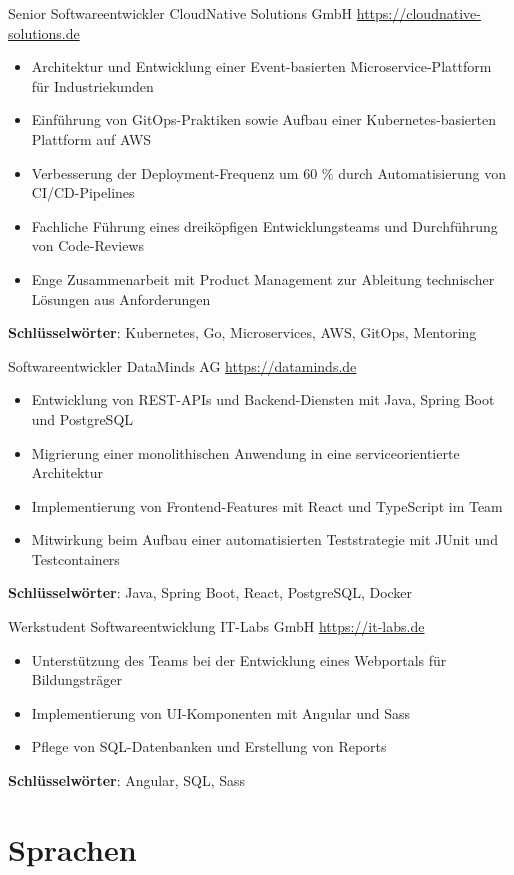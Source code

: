 \documentclass[a4paper, serif, 10pt]{moderncv}
\begin{document}
        {Senior Softwareentwickler}
        {CloudNative Solutions GmbH}
        {\url{https://cloudnative-solutions.de}}
        {}
        {\begin{itemize}
\item Architektur und Entwicklung einer Event-basierten Microservice-Plattform für Industriekunden
\item Einführung von GitOps-Praktiken sowie Aufbau einer Kubernetes-basierten Plattform auf AWS
\item Verbesserung der Deployment-Frequenz um 60 \% durch Automatisierung von CI/CD-Pipelines
\item Fachliche Führung eines dreiköpfigen Entwicklungsteams und Durchführung von Code-Reviews
\item Enge Zusammenarbeit mit Product Management zur Ableitung technischer Lösungen aus Anforderungen
\end{itemize}
\textbf{Schlüsselwörter}: Kubernetes, Go, Microservices, AWS, GitOps, Mentoring}

        {Softwareentwickler}
        {DataMinds AG}
        {\url{https://dataminds.de}}
        {}
        {\begin{itemize}
\item Entwicklung von REST-APIs und Backend-Diensten mit Java, Spring Boot und PostgreSQL
\item Migrierung einer monolithischen Anwendung in eine serviceorientierte Architektur
\item Implementierung von Frontend-Features mit React und TypeScript im Team
\item Mitwirkung beim Aufbau einer automatisierten Teststrategie mit JUnit und Testcontainers
\end{itemize}
\textbf{Schlüsselwörter}: Java, Spring Boot, React, PostgreSQL, Docker}

        {Werkstudent Softwareentwicklung}
        {IT-Labs GmbH}
        {\url{https://it-labs.de}}
        {}
        {\begin{itemize}
\item Unterstützung des Teams bei der Entwicklung eines Webportals für Bildungsträger
\item Implementierung von UI-Komponenten mit Angular und Sass
\item Pflege von SQL-Datenbanken und Erstellung von Reports
\end{itemize}
\textbf{Schlüsselwörter}: Angular, SQL, Sass}
\section{Sprachen}
\end{document}
